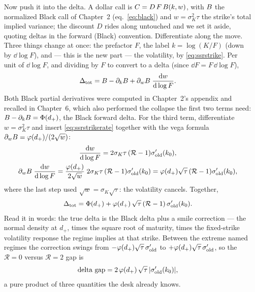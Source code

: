 Now push it into the delta.  A dollar call is
$C=D\,F\,B(k,w)$, with $B$ the normalized Black call of
Chapter~2 (eq.~\ref{eq:black}) and $w=\sigma_K^2\tau$ the strike's
total implied variance; the discount $D$ rides along untouched and we
set it aside, quoting deltas in the forward (Black) convention.
Differentiate along the move.  Three things change at once: the
prefactor $F$, the label $k=\log(K/F)$ (down by $\dd\log F$), and ---
this is the new part --- the volatility, by \eqref{eq:ssrstrike}.  Per
unit of $\dd\log F$, and dividing by $F$ to convert to a delta (since
$\dd F=F\,\dd\log F$),
\[
\Delta_{\mathrm{tot}}
=B-\partial_k B
+\partial_w B\;\frac{\mathrm{d} w}{\mathrm{d}\log F}.
\]
Both Black partial derivatives were computed in Chapter~2's appendix
and recalled in Chapter~6, which also performed the collapse the
first two terms need: $B-\partial_kB=\Phi(d_+)$, the Black
forward delta.  For the third term, differentiate
$w=\sigma_K^{2}\tau$ and insert \eqref{eq:ssrstrikerate} together with
the vega formula $\partial_w B=\varphi(d_+)/(2\sqrt{w})$:
\begin{gather*}
\frac{\mathrm{d} w}{\mathrm{d}\log F}
=2\sigma_K\tau\,(\mathcal{R}-1)\sigma_{\mathrm{old}}'(k_0),\\
\partial_w B\;\frac{\mathrm{d} w}{\mathrm{d}\log F}
=\frac{\varphi(d_+)}{2\sqrt{w}}\;2\sigma_K\tau\,(\mathcal{R}-1)
\sigma_{\mathrm{old}}'(k_0)
=\varphi(d_+)\sqrt{\tau}\,(\mathcal{R}-1)\sigma_{\mathrm{old}}'(k_0),
\end{gather*}
where the last step used $\sqrt{w}=\sigma_K\sqrt{\tau}$: the
volatility cancels.  Together,
\begin{equation}
\Delta_{\mathrm{tot}}
=\Phi(d_+)+\varphi(d_+)\,\sqrt{\tau}\,(\mathcal{R}-1)\,
\sigma_{\mathrm{old}}'(k_0) .
\label{eq:ssrdelta}
\end{equation}
Read it in words: the true delta is the Black delta plus a smile
correction --- the normal density at $d_+$, times the square root of
maturity, times the fixed-strike volatility response the regime
implies at that strike.  Between the extreme named regimes the
correction swings from $-\varphi(d_+)\sqrt{\tau}\,\sigma_{\mathrm{old}}'$
to $+\varphi(d_+)\sqrt{\tau}\,\sigma_{\mathrm{old}}'$, so the
$\mathcal{R}=0$ versus $\mathcal{R}=2$ gap is
\begin{equation}
\text{delta gap}
=2\,\varphi(d_+)\,\sqrt{\tau}\,\lvert\sigma_{\mathrm{old}}'(k_0)\rvert ,
\label{eq:ssrgap}
\end{equation}
a pure product of three quantities the desk already knows.

